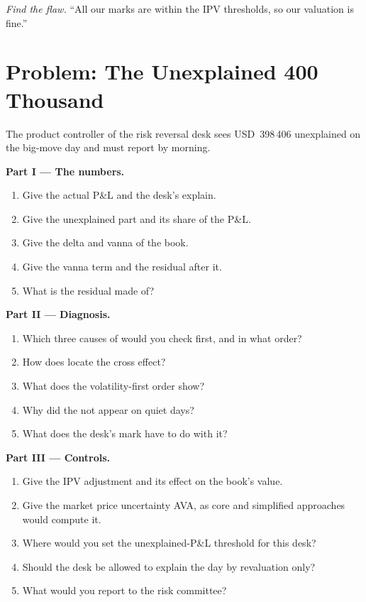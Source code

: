 \begin{exercise}[$\star\star\star$]\label{exo:rc:pnl-explain-and-independent-price-verification:8}
\emph{Find the flaw.} ``All our marks are within the IPV thresholds, so our valuation is fine.''
\end{exercise}

\section{Problem: The Unexplained 400 Thousand}

\begin{problem}\label{pb:rc:pnl-explain-and-independent-price-verification:1}
The product controller of the risk reversal desk sees USD~398\,406 unexplained on the big-move day and must
report by morning.

\medskip\noindent\textbf{Part I --- The numbers.}
\begin{enumerate}
\item Give the actual P\&L and the desk's explain.
\item Give the unexplained part and its share of the P\&L.
\item Give the delta and vanna of the book.
\item Give the vanna term and the residual after it.
\item What is the residual made of?
\end{enumerate}

\medskip\noindent\textbf{Part II --- Diagnosis.}
\begin{enumerate}[resume]
\item Which three causes of  would you check first, and in what order?
\item How does  locate the cross effect?
\item What does the volatility-first order show?
\item Why did the  not appear on quiet days?
\item What does the desk's  mark have to do with it?
\end{enumerate}

\medskip\noindent\textbf{Part III --- Controls.}
\begin{enumerate}[resume]
\item Give the IPV adjustment and its effect on the book's value.
\item Give the market price uncertainty AVA, as core and simplified approaches would compute it.
\item Where would you set the unexplained-P\&L threshold for this desk?
\item Should the desk be allowed to explain the day by revaluation only?
\item What would you report to the risk committee?
\end{enumerate}


\end{problem}
